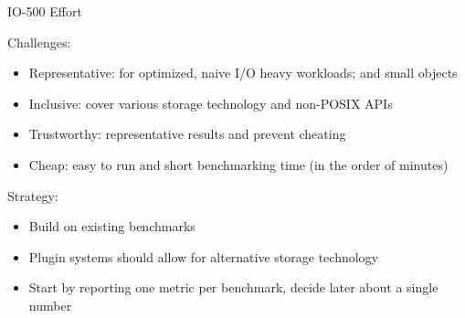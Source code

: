 \documentclass[portrait,a0paper,fontscale=0.4]{baposter}
\begin{document}
\begin{poster}
\begin{posterbox}[name=HHCC,column=1,span=2, below=schedule, above=bottom]{IO-500 Effort}
\vspace*{-1em}

Challenges:
\vspace*{-1em}
\begin{itemize}
\item Representative: for optimized, naive I/O heavy workloads; and small objects
\item Inclusive: cover various storage technology and non-POSIX APIs
\item Trustworthy: representative results and prevent cheating
\item Cheap: easy to run and short benchmarking time (in the order of minutes)
\end{itemize}


Strategy:
\vspace*{-1em}
\begin{itemize}
\item Build on existing benchmarks
\item Plugin systems should allow for alternative storage technology
\item Start by reporting one metric per benchmark, decide later about a single number
\end{itemize}


\end{posterbox}







\end{poster}
\end{document}
